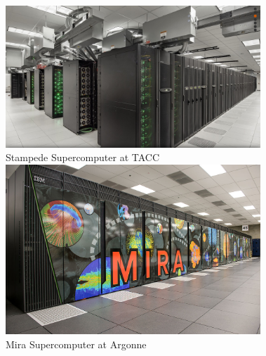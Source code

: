 \documentclass[18pt,xcolor=table]{beamer}
\newcounter{nn}
\begin{document}
\begin{frame}[t]
\begin{columns}[c]
\begin{column}{.5\textwidth}
\end{column}
\begin{column}{.5\textwidth}
\vspace{-3ex}
\begin{figure}[t]
\centering
\includegraphics[width=0.9\textwidth]{Motivation/Stampede.png}
\\\small{Stampede Supercomputer at TACC}\\
\includegraphics[width=0.9\textwidth]{Motivation/Mira.png}
\\\small{Mira Supercomputer at Argonne}\\
\end{figure}
\end{column}
\end{columns}

\end{frame}
\end{document}

